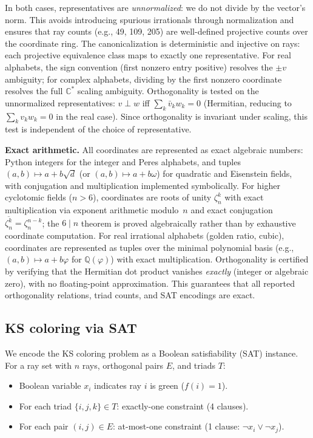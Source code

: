 \documentclass[12pt,a4paper]{article}
\newcommand{\C}{\mathbb{C}}
\newcommand{\Q}{\mathbb{Q}}
\begin{document}
In both cases, representatives are \emph{unnormalized}: we do not divide by the vector's norm. This avoids introducing spurious irrationals through normalization and ensures that ray counts (e.g., 49, 109, 205) are well-defined projective counts over the coordinate ring. The canonicalization is deterministic and injective on rays: each projective equivalence class maps to exactly one representative. For real alphabets, the sign convention (first nonzero entry positive) resolves the $\pm v$ ambiguity; for complex alphabets, dividing by the first nonzero coordinate resolves the full $\C^*$ scaling ambiguity. Orthogonality is tested on the unnormalized representatives: $v \perp w$ iff $\sum_k \bar{v}_k w_k = 0$ (Hermitian, reducing to $\sum_k v_k w_k = 0$ in the real case). Since orthogonality is invariant under scaling, this test is independent of the choice of representative.

\smallskip\noindent\textbf{Exact arithmetic.}  All coordinates are represented as exact algebraic numbers: Python integers for the integer and Peres alphabets, and tuples $(a, b) \mapsto a + b\sqrt{d}$ (or $(a,b) \mapsto a + b\omega$) for quadratic and Eisenstein fields, with conjugation and multiplication implemented symbolically.  For higher cyclotomic fields ($n > 6$), coordinates are roots of unity $\zeta_n^k$ with exact multiplication via exponent arithmetic modulo~$n$ and exact conjugation $\overline{\zeta_n^k} = \zeta_n^{n-k}$; the $6 \mid n$ theorem is proved algebraically rather than by exhaustive coordinate computation.  For real irrational alphabets (golden ratio, cubic), coordinates are represented as tuples over the minimal polynomial basis (e.g., $(a,b) \mapsto a + b\varphi$ for $\Q(\varphi)$) with exact multiplication.  Orthogonality is certified by verifying that the Hermitian dot product vanishes \emph{exactly} (integer or algebraic zero), with no floating-point approximation.  This guarantees that all reported orthogonality relations, triad counts, and SAT encodings are exact.

\subsection{KS coloring via SAT}

We encode the KS coloring problem as a Boolean satisfiability (SAT) instance. For a ray set with $n$ rays, orthogonal pairs $E$, and triads $T$:

\begin{itemize}
    \item Boolean variable $x_i$ indicates ray $i$ is green ($f(i) = 1$).
    \item For each triad $\{i, j, k\} \in T$: exactly-one constraint (4 clauses).
    \item For each pair $(i, j) \in E$: at-most-one constraint (1 clause: $\neg x_i \lor \neg x_j$).
\end{itemize}
\end{document}
